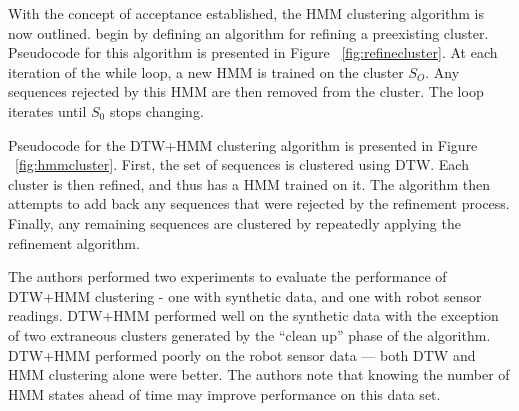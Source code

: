 \documentclass[12pt]{article}
\begin{document}
With the concept of acceptance established, the HMM clustering algorithm is now outlined. \citeauthor{oates} begin by defining an algorithm for refining a preexisting cluster. Pseudocode for this algorithm is presented in Figure ~\ref{fig:refinecluster}. At each iteration of the while loop, a new HMM is trained on the cluster $S_O$. Any sequences rejected by this HMM are then removed from the cluster. The loop iterates until $S_0$ stops changing.

Pseudocode for the DTW+HMM clustering algorithm is presented in Figure ~\ref{fig:hmmcluster}. First, the set of sequences is clustered using DTW. Each cluster is then refined, and thus has a
HMM trained on it. The algorithm then attempts to add back any sequences that were rejected by the refinement process. Finally, any remaining sequences are clustered by repeatedly applying the refinement algorithm.

The authors performed two experiments to evaluate the performance of DTW+HMM clustering - one with synthetic data, and one with robot sensor readings. DTW+HMM performed well on the synthetic data with the exception of two extraneous clusters generated by the ``clean up'' phase of the algorithm. DTW+HMM performed poorly on the robot sensor data --- both DTW and HMM clustering alone were better. The authors note that knowing the number of HMM states ahead of time may improve performance
on this data set.
{}

\end{document}
